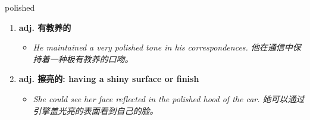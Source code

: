 
\begin{frame}
{\huge polished}
\begin{center}
\begin{enumerate}\Large
  \item \textbf{adj. 有教养的}
  \begin{itemize}
    \item \em{\Large{He maintained a very polished tone in his correspondences. 他在通信中保持着一种极有教养的口吻。}}
  \end{itemize}
  \item \textbf{adj. 擦亮的: having a shiny surface or finish}
  \begin{itemize}
    \item \em{\Large{She could see her face reflected in the polished hood of the car. 她可以通过引擎盖光亮的表面看到自己的脸。}}
  \end{itemize}
\end{enumerate}
\end{center}
\end{frame}
